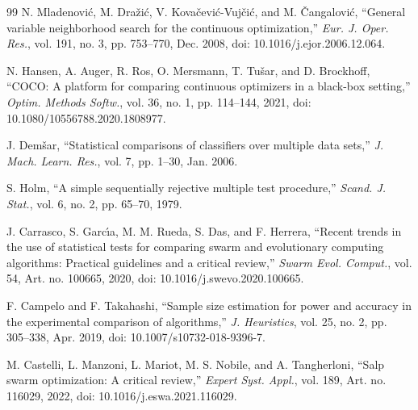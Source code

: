 {\begin{thebibliography}{99}
N. Mladenovi\'c, M. Dra\v{z}i\'c, V. Kova\v{c}evi\'c-Vuj\v{c}i\'c, and M. \v{C}angalovi\'c, ``General variable neighborhood search for the continuous optimization,'' \textit{Eur. J. Oper. Res.}, vol. 191, no. 3, pp. 753--770, Dec. 2008, doi: 10.1016/j.ejor.2006.12.064.

N. Hansen, A. Auger, R. Ros, O. Mersmann, T. Tu\v{s}ar, and D. Brockhoff, ``COCO: A platform for comparing continuous optimizers in a black-box setting,'' \textit{Optim. Methods Softw.}, vol. 36, no. 1, pp. 114--144, 2021, doi: 10.1080/10556788.2020.1808977.

J. Dem\v{s}ar, ``Statistical comparisons of classifiers over multiple data sets,'' \textit{J. Mach. Learn. Res.}, vol. 7, pp. 1--30, Jan. 2006.

S. Holm, ``A simple sequentially rejective multiple test procedure,'' \textit{Scand. J. Stat.}, vol. 6, no. 2, pp. 65--70, 1979.

J. Carrasco, S. Garc\'{\i}a, M. M. Rueda, S. Das, and F. Herrera, ``Recent trends in the use of statistical tests for comparing swarm and evolutionary computing algorithms: Practical guidelines and a critical review,'' \textit{Swarm Evol. Comput.}, vol. 54, Art. no. 100665, 2020, doi: 10.1016/j.swevo.2020.100665.

F. Campelo and F. Takahashi, ``Sample size estimation for power and accuracy in the experimental comparison of algorithms,'' \textit{J. Heuristics}, vol. 25, no. 2, pp. 305--338, Apr. 2019, doi: 10.1007/s10732-018-9396-7.

M. Castelli, L. Manzoni, L. Mariot, M. S. Nobile, and A. Tangherloni, ``Salp swarm optimization: A critical review,'' \textit{Expert Syst. Appl.}, vol. 189, Art. no. 116029, 2022, doi: 10.1016/j.eswa.2021.116029.


\end{thebibliography}}
